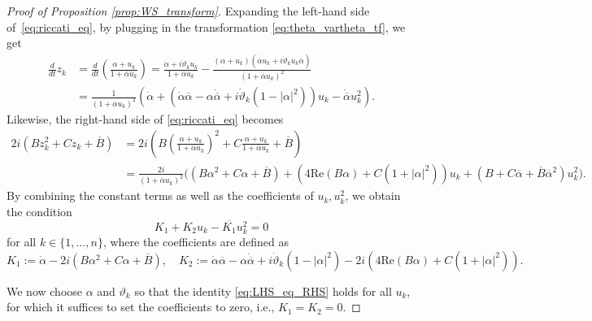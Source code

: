 \documentclass[10pt]{article}
\theoremstyle{definition}
\theoremstyle{definition}
\numberwithin{equation}{section}
\newcommand{\re}[1]{\mathrm{Re}\left(#1\right)}
\newcommand{\alphaBar}{\overline{\alpha}}
\newcommand{\Dalpha}{\Dot{\alpha}}
\newcommand{\DalphaBar}{\Dot{\overline{\alpha}}}
\newcommand{\Dvartheta}{\Dot{\vartheta}}
\begin{document}
\begin{proof}[Proof of Proposition \ref{prop:WS_transform}]
    Expanding the left-hand side of~\eqref{eq:riccati_eq}, by plugging in the transformation \eqref{eq:theta_vartheta_tf}, we get
    \begin{equation*}
    \begin{split}
    \frac{d}{dt} z_k
    &= \frac{d}{dt} \left( \frac{\alpha + u_k}{1 + \alphaBar u_k }\right) = \frac{\Dalpha + i \Dvartheta_k u_k}{1 + \alphaBar u_k} - \frac{\left(\alpha + u_k \right) \left( \DalphaBar u_k + i \Dvartheta_k u_k \alphaBar \right)}{\left( 1 + \alphaBar u_k \right)^2}\\
    &= \frac{1}{\left( 1 + \alphaBar u_k \right)^2} \left( \Dalpha + \left( \Dalpha \alphaBar - \alpha \DalphaBar + i \Dvartheta_k (1- |\alpha|^2)  \right) u_k - \DalphaBar u_k^2 \right).
    \end{split}
    \end{equation*}
    Likewise, the right-hand side of \eqref{eq:riccati_eq} becomes
    \begin{equation*}
    \begin{split}
    2i \left( B z_k^2 + C z_k + \overline{B} \right)
    &= 2i \left( B \left( \frac{\alpha + u_k}{1 + \alphaBar u_k} \right)^2 + C \frac{\alpha + u_k}{1 + \alphaBar u_k} + \overline{B} \right)\\
    &= \frac{2i}{\left( 1 + \overline{\alpha} u_k \right)^2} \bigg( \left( B \alpha^2 +  C \alpha + \overline{B} \right) + \left(4 \re{B \alpha} + C \left( 1 + |\alpha|^2 \right) \right) u_k + \left( B + C \alphaBar  + \overline{B} \alphaBar^2 \right) u_k^2 \bigg) .
    \end{split}
    \end{equation*}
    By combining the constant terms as well as the coefficients of $u_k, u_k^2$, we obtain the condition
    \begin{equation}\label{eq:LHS_eq_RHS}
    K_1 + K_2 u_k - \overline{K_1} u_k^2 = 0
    \end{equation}
    for all $k \in \{1,\dots,n\}$, where the coefficients are defined as
    \begin{equation*}
    K_1 := \Dalpha - 2i \left( B \alpha^2 + C \alpha + \overline{B} \right), \quad K_2 :=  \Dalpha \alphaBar - \alpha \DalphaBar + i \Dvartheta_k (1 - |\alpha|^2) - 2i \left( 4\re{B\alpha} + C(1 + |\alpha|^2) \right) .
    \end{equation*}

    We now choose $\alpha$ and $\vartheta_k$ so that the identity \eqref{eq:LHS_eq_RHS} holds for all $u_k$, for which it suffices to set the coefficients to zero, i.e., $K_1 = K_2 = 0$.
    

\end{proof}
\end{document}

